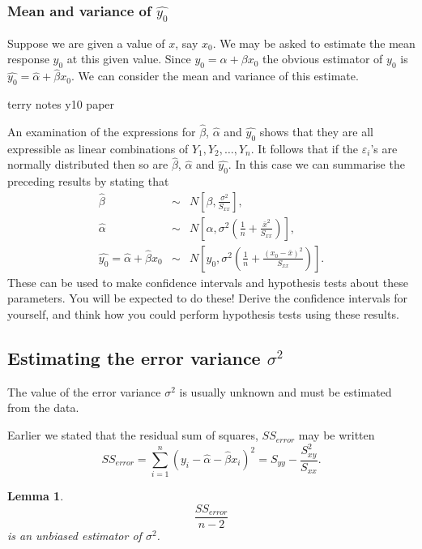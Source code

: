 \documentclass[12pt]{article}
\theoremstyle{break}
\newtheorem{lemma}[theorem]{Lemma}
\begin{document}
\subsubsection{Mean and variance of $\hat{y_{0}}$}
Suppose we are given a value of $x$, say $x_{0}$. We may be asked to estimate the mean response $y_{0}$ at this given value. Since $y_{0}=\alpha+\beta x_{0}$ the obvious estimator of $y_{0}$ is $\hat{y_{0}}=\hat{\alpha}+\hat{\beta} x_{0}.$ We can consider the mean and variance of this estimate.
\begin{mdframed}
\textcolor[rgb]{1.00,1.00,1.00}{terry notes y10 paper\lipsum[1-4]}
\end{mdframed}

An examination of the expressions for $\hat{\beta}$, $\hat{\alpha}$ and $\hat{y_{0}}$ shows that they are all expressible as linear combinations of $Y_{1},Y_{2},\ldots,Y_{n}$. It follows that if the $\varepsilon_{i}$'s are normally distributed then so are $\hat{\beta}$, $\hat{\alpha}$ and $\hat{y_{0}}$. In this case we can summarise the preceding results by stating that
\begin{eqnarray*}
  \hat{\beta} &\sim& N\left[\beta,\frac{\sigma^{2}}{S_{xx}}\right], \\
  \hat{\alpha} &\sim& N\left[\alpha,\sigma^{2}\left(\frac{1}{n}+\frac{\bar{x}^{2}}{S_{xx}}\right)\right], \\
  \hat{y_{0}}=\hat{\alpha}+\hat{\beta}x_{0} &\sim& N\left[y_{0},\sigma^{2}\left(\frac{1}{n}+\frac{(x_{0}-\bar{x})^{2}}{S_{xx}}\right)\right].
\end{eqnarray*}
These can be used to make confidence intervals and hypothesis tests about these parameters. You will be expected to do these! Derive the confidence intervals for yourself, and think how you could perform hypothesis tests using these results.

\subsection{Estimating the error variance $\sigma^{2}$}
The value of the error variance $\sigma^{2}$ is usually unknown and must be estimated from the data.

Earlier we stated that the residual sum of squares, $SS_{error}$ may be written
$$SS_{error}=\sum_{i=1}^{n}(y_{i}-\hat{\alpha}-\hat{\beta} x_{i})^{2}=S_{yy}-\frac{S^{2}_{xy}}{S_{xx}}.$$

\begin{lemma}
  $$\frac{SS_{error}}{n-2}$$ is an unbiased estimator of $\sigma^{2}$.
\end{lemma}
\end{document}
